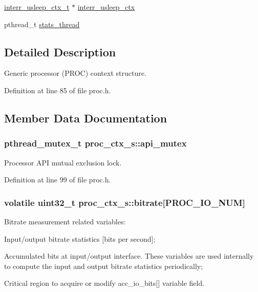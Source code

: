{\bf }\par
\begin{DoxyCompactItemize}
\item 
\hyperlink{interr__usleep_8c_a952a138df6a0c053aa91d931c6c7de57}{interr\+\_\+usleep\+\_\+ctx\+\_\+t} $\ast$ \hyperlink{structproc__ctx__s_ae60a995d574f7f3e1719439b77ea02f9}{interr\+\_\+usleep\+\_\+ctx}
\item 
pthread\+\_\+t \hyperlink{structproc__ctx__s_a9cd9d87dfa63404f23d5571feaefcb71}{stats\+\_\+thread}
\end{DoxyCompactItemize}



\subsection{Detailed Description}
Generic processor (P\+R\+OC) context structure. 

Definition at line 85 of file proc.\+h.



\subsection{Member Data Documentation}
\subsubsection[{\texorpdfstring{api\+\_\+mutex}{api_mutex}}]{\setlength{\rightskip}{0pt plus 5cm}pthread\+\_\+mutex\+\_\+t proc\+\_\+ctx\+\_\+s\+::api\+\_\+mutex}\hypertarget{structproc__ctx__s_aea90c57d9b0a303b638a51ce7efa9a1e}{}\label{structproc__ctx__s_aea90c57d9b0a303b638a51ce7efa9a1e}
Processor A\+PI mutual exclusion lock. 

Definition at line 99 of file proc.\+h.

\subsubsection[{\texorpdfstring{bitrate}{bitrate}}]{\setlength{\rightskip}{0pt plus 5cm}volatile uint32\+\_\+t proc\+\_\+ctx\+\_\+s\+::bitrate\mbox{[}P\+R\+O\+C\+\_\+\+I\+O\+\_\+\+N\+UM\mbox{]}}\hypertarget{structproc__ctx__s_a31bad437eed5d81c08a01538416c3639}{}\label{structproc__ctx__s_a31bad437eed5d81c08a01538416c3639}
Bitrate measurement related variables\+:
\begin{DoxyItemize}
\item Input/output bitrate statistics \mbox{[}bits per second\mbox{]};
\item Accumulated bits at input/output interface. These variables are used internally to compute the input and output bitrate statistics periodically;
\item Critical region to acquire or modify \textquotesingle{}acc\+\_\+io\+\_\+bits\mbox{[}\mbox{]}\textquotesingle{} variable field. 
\end{DoxyItemize}

